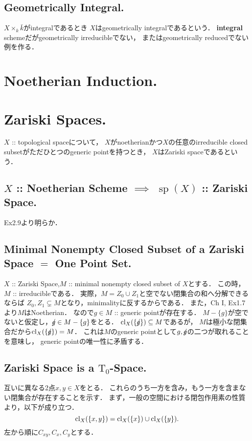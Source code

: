 \documentclass[a4paper]{jsarticle}
\newcommand{\basesp}{\operatorname{sp}}
\newcommand{\mnot}{/\hspace{-1.2ex}}
\begin{document}
    \subsection{Geometrically Integral.}
    $X \times_k \bar{k}$がintegralであるとき
    $X$はgeometrically integralであるという．
    \textbf{integral} schemeだがgeometrically irreducibleでない，
    またはgeometrically reducedでない例を作る．

\section{Noetherian Induction.} %

\section{Zariski Spaces.} %
    $X$ :: topological spaceについて，
    $X$がnoetherianかつ$X$の任意のirreducible closed subsetがただひとつのgeneric pointを持つとき，
    $X$はZariski spaceであるという．

    \subsection{$X$ :: Noetherian Scheme $\implies$ $\basesp(X)$ :: Zariski Space.}
    Ex2.9より明らか．

    \subsection{Minimal Nonempty Closed Subset of a Zariski Space $=$ One Point Set.}
    $X$ :: Zariski Space,$M$ :: minimal nonempty closed subset of $X$とする．
    この時，$M$ :: irreducibleである．
    実際，$M=Z_0 \cup Z_1$と空でない閉集合の和へ分解できるならば
    $Z_0,Z_1 \subsetneq M$となり，minimalityに反するからである．
    また，Ch I, Ex1.7より$M$はNoetherian．
    なので$g \in M$ :: generic pointが存在する．
    $M-\{g\}$が空でないと仮定し，$\mnot g \in M-\{g\}$をとる．
    $\cl_X(\{\mnot g\}) \subseteq M$であるが，
    $M$は極小な閉集合だから$\cl_X(\{\mnot g\})=M$．
    これは$M$のgeneric pointとして$g, \mnot g$の二つが取れることを意味し，
    generic pointの唯一性に矛盾する．

    \subsection{Zariski Space is a $\mathrm{T_0}$-Space.}
    互いに異なる2点$x,y \in X$をとる．
    これらのうち一方を含み，もう一方を含まない閉集合が存在することを示す．
    まず，一般の空間における閉包作用素の性質より，以下が成り立つ．
    \[ \operatorname{cl}_X(\{x,y\})=\operatorname{cl}_X(\{x\}) \cup \operatorname{cl}_X(\{y\}). \]
    左から順に$C_{xy}, C_x, C_y$とする．
\end{document}
